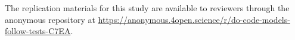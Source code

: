 The replication materials for this study are available to reviewers through the anonymous repository at
\url{https://anonymous.4open.science/r/do-code-models-follow-tests-C7EA}.

